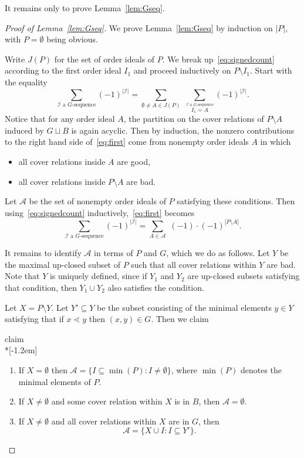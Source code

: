 \documentclass[ALCO,ThmDefs,Unicode,epreuves]{cedram}
\begin{document}
It remains only to prove Lemma~\ref{lem:Gseq}.
\begin{proof}[Proof of Lemma~\ref{lem:Gseq}] We prove Lemma~\ref{lem:Gseq} by induction on $|P|$, with $P=\emptyset$ being obvious. 

Write $J(P)$ for the set of order ideals of $P$. 
We break up~\eqref{eq:signedcount} according to the first order ideal $I_1$ and proceed inductively on $P\setminus I_1$. Start with the equality
\begin{equation}\label{eq:first}
\sum_\text{$\mathcal{I}$ a $G$-sequence} \! (-1)^{|\mathcal{I}|} = \sum_{\emptyset\ne A \in J(P)} \,\,\sum_{\stackrel{\text{$\mathcal{I}$ a $G$-sequence}}{I_1=A}} (-1)^{|\mathcal{I}|}.
\end{equation}
Notice that for any order ideal $A$, the partition on the cover relations of $P\setminus A$ induced by $G\sqcup B$ is again acyclic. Then by induction, the nonzero contributions to the right hand side of~\eqref{eq:first} come from nonempty order ideals $A$ in which 
\begin{itemize}
\item all cover relations inside $A$ are good,
\item all cover relations inside $P\setminus A$ are bad.
\end{itemize}

Let $\mathcal{A}$ be the set of nonempty order ideals of $P$ satisfying these conditions. Then using~\eqref{eq:signedcount} inductively,~\eqref{eq:first} becomes
\begin{equation}\label{eq:second}
\sum_\text{$\mathcal{I}$ a $G$-sequence} \! (-1)^{|\mathcal{I}|} = \sum_{A\in \mathcal{A}} \,\,(-1)\cdot (-1)^{|P\setminus A|}.
\end{equation}

It remains to identify $\mathcal{A}$ in terms of $P$ and $G$, which we do as follows. Let $Y$ be the maximal up-closed subset of $P$ such that all cover relations within $Y$ are bad. Note that $Y$ is uniquely defined, since if $Y_1$ and $Y_2$ are up-closed subsets satisfying that condition, then $Y_1\cup Y_2$ also satisfies the condition. 

Let $X = P\setminus Y$. Let $Y'\subseteq Y$ be the subset consisting of the minimal elements $y\in Y$ satisfying that if $x\lessdot y$ then $(x,y)\in G$. 
Then we claim 
\begin{enonce}{claim}\label{c:A}\ \\*[-1.2em]
\begin{enumerate}
\item\label{claim3.20_1} If $X = \emptyset$ then $\mathcal{A} = \{I \subseteq \min(P): I\ne \emptyset\}$, where $\min(P)$ denotes the minimal elements of $P$.
\item\label{claim3.20_2} If $X\ne \emptyset$ and some cover relation within $X$ is in $B$, then $\mathcal{A}=\emptyset$.
\item\label{claim3.20_3} If $X\ne \emptyset$ and all cover relations within $X$ are in $G$, then
\[
\mathcal{A} = \{X\cup I: I\subseteq Y'\}.
\]
\end{enumerate}
\end{enonce}



\end{proof}
\end{document}

